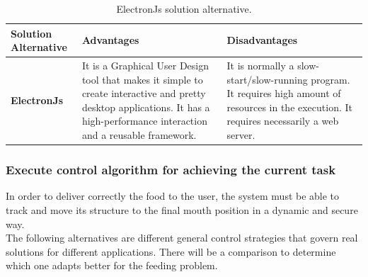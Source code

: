 \documentclass[11pt]{report} %
\begin{document}
\begin{table}[H]
\begin{center}
    \begin{tabular}{M{6.6cm}M{3.3cm}M{3.3cm}}
    \hline
    \textbf{Solution Alternative} & \textbf{Advantages} & \textbf{Disadvantages} \\ 
    \hline

    \textbf{ElectronJs}
    

    \citep{cite_electron_js}
    
    &
    
    It is a Graphical User Design tool that makes it simple to create interactive and pretty desktop applications. It has a high-performance interaction and a reusable framework.
    
    &
    
    It is normally a slow-start/slow-running program. It requires high amount of resources in the execution. It requires necessarily a web server.
    
    \\ \hline
    \end{tabular}
\caption{\label{tab:electronjs} ElectronJs solution alternative.}
\end{center}
\end{table}


\subsubsection{Execute control algorithm for achieving the current task}

In order to deliver correctly the food to the user, the system must be able to track and move its structure to the final mouth position in a dynamic and secure way.\\

The following alternatives are different general control strategies that govern real solutions for different applications. There will be a comparison to determine which one adapts better for the feeding problem.\\
\end{document}
